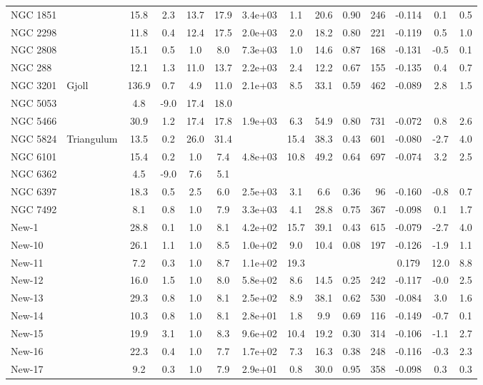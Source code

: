 \begin{tabular}{llSSSSSSSSrSSS}
NGC 1851 &  & 15.8 & 2.3 & 13.7 & 17.9 & 3.4e+03 & 1.1 & 20.6 & 0.90 & 246 & -0.114 & 0.1 & 0.5 \\
NGC 2298 &  & 11.8 & 0.4 & 12.4 & 17.5 & 2.0e+03 & 2.0 & 18.2 & 0.80 & 221 & -0.119 & 0.5 & 1.0 \\
NGC 2808 &  & 15.1 & 0.5 & 1.0 & 8.0 & 7.3e+03 & 1.0 & 14.6 & 0.87 & 168 & -0.131 & -0.5 & 0.1 \\
NGC 288 &  & 12.1 & 1.3 & 11.0 & 13.7 & 2.2e+03 & 2.4 & 12.2 & 0.67 & 155 & -0.135 & 0.4 & 0.7 \\
NGC 3201 & Gjoll & 136.9 & 0.7 & 4.9 & 11.0 & 2.1e+03 & 8.5 & 33.1 & 0.59 & 462 & -0.089 & 2.8 & 1.5 \\
NGC 5053 &  & 4.8 & -9.0 & 17.4 & 18.0 &  &  &  &  &  &  &  &  \\
NGC 5466 &  & 30.9 & 1.2 & 17.4 & 17.8 & 1.9e+03 & 6.3 & 54.9 & 0.80 & 731 & -0.072 & 0.8 & 2.6 \\
NGC 5824 & Triangulum & 13.5 & 0.2 & 26.0 & 31.4 &  & 15.4 & 38.3 & 0.43 & 601 & -0.080 & -2.7 & 4.0 \\
NGC 6101 &  & 15.4 & 0.2 & 1.0 & 7.4 & 4.8e+03 & 10.8 & 49.2 & 0.64 & 697 & -0.074 & 3.2 & 2.5 \\
NGC 6362 &  & 4.5 & -9.0 & 7.6 & 5.1 &  &  &  &  &  &  &  &  \\
NGC 6397 &  & 18.3 & 0.5 & 2.5 & 6.0 & 2.5e+03 & 3.1 & 6.6 & 0.36 & 96 & -0.160 & -0.8 & 0.7 \\
NGC 7492 &  & 8.1 & 0.8 & 1.0 & 7.9 & 3.3e+03 & 4.1 & 28.8 & 0.75 & 367 & -0.098 & 0.1 & 1.7 \\
New-1 &  & 28.8 & 0.1 & 1.0 & 8.1 & 4.2e+02 & 15.7 & 39.1 & 0.43 & 615 & -0.079 & -2.7 & 4.0 \\
New-10 &  & 26.1 & 1.1 & 1.0 & 8.5 & 1.0e+02 & 9.0 & 10.4 & 0.08 & 197 & -0.126 & -1.9 & 1.1 \\
New-11 &  & 7.2 & 0.3 & 1.0 & 8.7 & 1.1e+02 & 19.3 &  &  &  & 0.179 & 12.0 & 8.8 \\
New-12 &  & 16.0 & 1.5 & 1.0 & 8.0 & 5.8e+02 & 8.6 & 14.5 & 0.25 & 242 & -0.117 & -0.0 & 2.5 \\
New-13 &  & 29.3 & 0.8 & 1.0 & 8.1 & 2.5e+02 & 8.9 & 38.1 & 0.62 & 530 & -0.084 & 3.0 & 1.6 \\
New-14 &  & 10.3 & 0.8 & 1.0 & 8.1 & 2.8e+01 & 1.8 & 9.9 & 0.69 & 116 & -0.149 & -0.7 & 0.1 \\
New-15 &  & 19.9 & 3.1 & 1.0 & 8.3 & 9.6e+02 & 10.4 & 19.2 & 0.30 & 314 & -0.106 & -1.1 & 2.7 \\
New-16 &  & 22.3 & 0.4 & 1.0 & 7.7 & 1.7e+02 & 7.3 & 16.3 & 0.38 & 248 & -0.116 & -0.3 & 2.3 \\
New-17 &  & 9.2 & 0.3 & 1.0 & 7.9 & 2.9e+01 & 0.8 & 30.0 & 0.95 & 358 & -0.098 & 0.3 & 0.3 \\
\hline
\end{tabular}